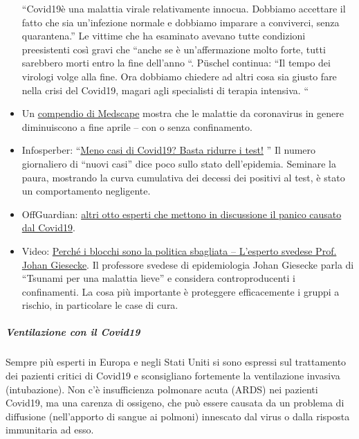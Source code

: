 \begin{itemize}
  ``Covid19è una malattia virale relativamente innocua. Dobbiamo
  accettare il fatto che sia un'infezione normale e dobbiamo imparare a
  conviverci, senza quarantena.'' Le vittime che ha esaminato avevano
  tutte condizioni preesistenti così gravi che ``anche se è
  un'affermazione molto forte, tutti sarebbero morti entro la fine
  dell'anno ``. Püschel continua: ``Il tempo dei virologi volge alla
  fine. Ora dobbiamo chiedere ad altri cosa sia giusto fare nella crisi
  del Covid19, magari agli specialisti di terapia intensiva. ``
\item
  Un
  \href{https://emedicine.medscape.com/article/227820-overview}{compendio
  di Medscape} mostra che le malattie da coronavirus in genere
  diminuiscono a fine aprile -- con o senza confinamento.
\item
  Infosperber:
  ``\href{https://www.infosperber.ch/Artikel/Gesundheit/Weniger-Corona-Falle-Einfach-weniger-testen}{Meno
  casi di Covid19? Basta ridurre i test!} '' Il numero giornaliero di
  ``nuovi casi'' dice poco sullo stato dell'epidemia. Seminare la paura,
  mostrando la curva cumulativa dei decessi dei positivi al test, è
  stato un comportamento negligente.
\item
  OffGuardian:
  \href{https://off-guardian.org/2020/04/17/8-more-experts-questioning-the-coronavirus-panic/}{altri
  otto esperti che mettono in discussione il panico causato dal
  Covid19}.
\item
  Video: \href{https://www.youtube.com/watch?v=bfN2JWifLCY}{Perché i
  blocchi sono la politica sbagliata -- L'esperto svedese Prof. Johan
  Giesecke}. Il professore svedese di epidemiologia Johan Giesecke parla
  di ``Tsunami per una malattia lieve'' e considera controproducenti i
  confinamenti. La cosa più importante è proteggere efficacemente i
  gruppi a rischio, in particolare le case di cura.
\end{itemize}

\hypertarget{ventilazione-con-il-covid19}{%
\subparagraph{\texorpdfstring{\textbf{Ventilazione con il
Covid19}}{Ventilazione con il Covid19}}\label{ventilazione-con-il-covid19}}

Sempre più esperti in Europa e negli Stati Uniti si sono espressi sul
trattamento dei pazienti critici di Covid19 e sconsigliano fortemente la
ventilazione invasiva (intubazione). Non c'è insufficienza polmonare
acuta (ARDS) nei pazienti Covid19, ma una carenza di ossigeno, che può
essere causata da un problema di diffusione (nell'apporto di sangue ai
polmoni) innescato dal virus o dalla risposta immunitaria ad esso.

